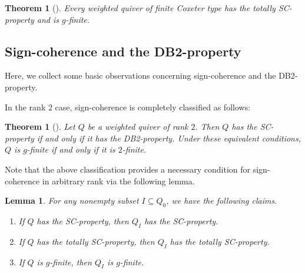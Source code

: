 \documentclass[11pt,reqno]{amsart}
\numberwithin{equation}{section}
\theoremstyle{definition}
\theoremstyle{plain}
\newtheorem{lemma}[example]{Lemma}
\newtheorem{theorem}[example]{Theorem}
\begin{document}
	\begin{theorem}[{\cite[Theorem~8.2]{AC25}}]\label{thm:Cox-SC-gfin}
		Every weighted quiver of finite Coxeter type has the totally SC-property and is $g$-finite.
	\end{theorem}

\subsection{Sign-coherence and the DB2-property}
  Here, we collect some basic observations concerning sign-coherence and the DB2-property.

  In the rank $2$ case, sign-coherence is completely classified as follows:
	\begin{theorem}[{\cite[Theorem~7.1 and Example~7.5]{AC25}}]\label{thm:SC-D-rank2}
		Let $Q$ be a weighted quiver of rank $2$. Then $Q$ has the SC-property if and only if it has the DB2-property. Under these equivalent conditions, $Q$ is $g$-finite if and only if it is $2$-finite.
	\end{theorem}
	
  Note that the above classification provides a necessary condition for sign-coherence in arbitrary rank via the following lemma.

	\begin{lemma}\label{lem:SC-full}
		For any nonempty subset $I\subseteq Q_0$, we have the following claims.
		\begin{enumerate}[label=\textup{(\arabic*)}]
			\item If $Q$ has the SC-property, then $Q_I$ has the SC-property.
			\item If $Q$ has the totally SC-property, then $Q_I$ has the totally SC-property.
			\item If $Q$ is $g$-finite, then $Q_I$ is $g$-finite.
		\end{enumerate}
	\end{lemma}
	
\end{document}
